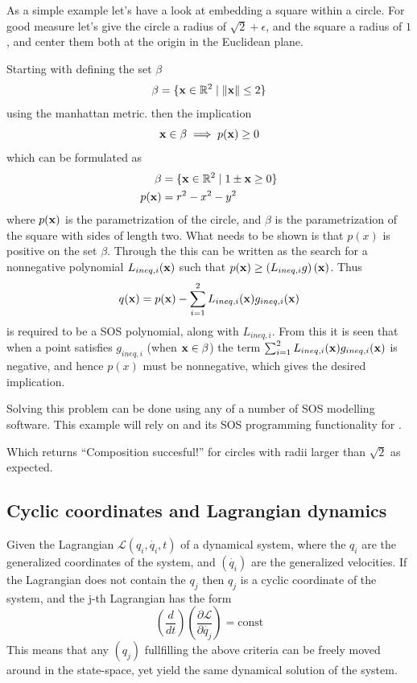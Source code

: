 \begin{example}

  As a simple example let's have a look at embedding a square within a circle.
  For good measure let's give the circle a radius of \(\sqrt{2}+\epsilon\), and
  the square a radius of \(1\), and center them both at the origin in the
  Euclidean plane.

  Starting with defining the set \(\beta\)
  \[
    \beta = \lbrace\mathbf{x} \in \mathbb{R}^2 \mid \lVert\mathbf{x}\rVert \leq 2\rbrace
  \]
  using the manhattan metric. then the implication
  \[
    \mathbf{x} \in \beta \implies p(\mathbf{x}) \geq 0
  \]
  which can be formulated as
  \begin{align*}
    \beta &= \lbrace\mathbf{x} \in \mathbb{R}^2 \mid 1 \pm \mathbf{x} \geq 0 \rbrace \\
    p(\mathbf{x}) &= r^2 - x^2 - y^2
  \end{align*}
  where \(p(\mathbf{x})\) is the parametrization of the circle, and \(\beta\) is
  the parametrization of the square with sides of length two. What needs to be
  shown is that \(p(x)\) is positive on the set \(\beta\). Through the
   this can be written as the search for a nonnegative
  polynomial \(L_{ineq,i}(\mathbf{x})\) such that \(p(\mathbf{x}) \geq \left(
    L_{ineq,i}g \right)(\mathbf{x})\). Thus
  \[
    q(\mathbf{x}) = p(\mathbf{x}) -
    \sum_{i=1}^{2}L_{ineq,i}(\mathbf{x})g_{ineq,i}(\mathbf{x})
  \]
  is required to be a \ac{SOS} polynomial, along with \(L_{ineq,i}\). From this
  it is seen that when a point satisfies \(g_{ineq,i}\) (\ie when \(\mathbf{x} \in
  \beta\)) the term \(\sum_{i=1}^{2}L_{ineq,i}(\mathbf{x})g_{ineq,i}(\mathbf{x})\)
  is negative, and hence \(p(x)\) must be nonnegative, which gives the desired
  implication.

  Solving this problem can be done using any of a number of \ac{SOS} modelling
  software. This example will rely on \cite[Yalmip]{Lofberg2004} and its
  \ac{SOS} programming functionality \cite{Lofberg2009} for \matlab.


  

  Which returns ``Composition succesful!'' for circles with radii larger than
  \(\sqrt{2}\) as expected.
\end{example}

\subsection{Cyclic coordinates and Lagrangian dynamics}
\label{subsec:cyclic-coordinates}

Given the Lagrangian \(\mathcal{L}(q_i, \dot{q_i}, t)\) of a dynamical system,
where the \(q_i\) are the generalized coordinates of the system, and
\((\dot{q_i})\) are the generalized velocities. If the Lagrangian does not
contain the \(q_j\) then \(q_j\) is a cyclic coordinate of the system, and the
j-th Lagrangian has the form
\[
  \left( \frac{d}{dt} \right) \left( \frac{\partial \mathcal{L}}{\partial
      \dot{q_j}} \right) = \mathrm{const}
\]
This means that any \((q_j)\) fullfilling the above criteria can be freely moved
around in the state-space, yet yield the same dynamical solution of the system.


